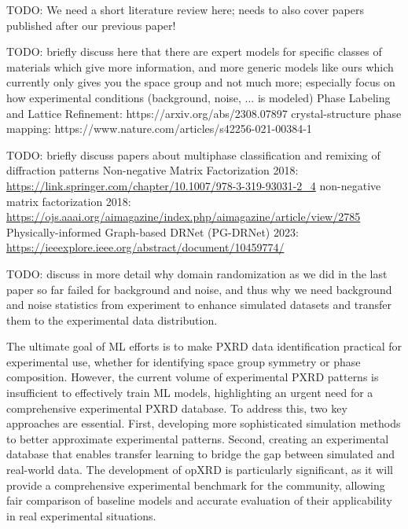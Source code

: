 TODO: We need a short literature review here; needs to also cover papers published after our previous paper!

TODO: briefly discuss here that there are expert models for specific classes of materials which give more information, and more generic models like ours which currently only gives you the space group and not much more; especially focus on how experimental conditions (background, noise, ... is modeled)
Phase Labeling and Lattice Refinement: https://arxiv.org/abs/2308.07897
crystal-structure phase mapping: https://www.nature.com/articles/s42256-021-00384-1


TODO: briefly discuss papers about multiphase classification and remixing of diffraction patterns
Non-negative Matrix Factorization 2018: \url{https://link.springer.com/chapter/10.1007/978-3-319-93031-2_4}
non-negative matrix factorization 2018: \url{https://ojs.aaai.org/aimagazine/index.php/aimagazine/article/view/2785}
Physically-informed Graph-based DRNet (PG-DRNet) 2023: \url{https://ieeexplore.ieee.org/abstract/document/10459774/}

TODO: discuss in more detail why domain randomization as we did in the last paper so far failed for background and noise, and thus why we need background and noise statistics from experiment to enhance simulated datasets and transfer them to the experimental data distribution.

The ultimate goal of ML efforts is to make PXRD data identification practical for experimental use, whether for identifying space group symmetry or phase composition. However, the current volume of experimental PXRD patterns is insufficient to effectively train ML models, highlighting an urgent need for a comprehensive experimental PXRD database. To address this, two key approaches are essential. First, developing more sophisticated simulation methods to better approximate experimental patterns\cite{cao2024simxrd}. Second, creating an experimental database that enables transfer learning to bridge the gap between simulated and real-world data. The development of opXRD is particularly significant, as it will provide a comprehensive experimental benchmark for the community, allowing fair comparison of baseline models and accurate evaluation of their applicability in real experimental situations.